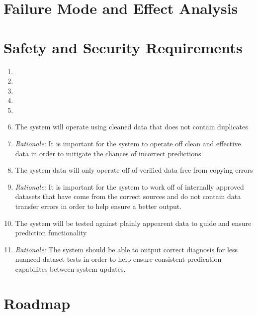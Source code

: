 \documentclass{article}
\begin{document}
\section{Failure Mode and Effect Analysis}


\section{Safety and Security Requirements}

\begin{enumerate}[label=SR\arabic*.]
	\item 
	\item
	\item 
	\item 
	\item 

	\item The system will operate using cleaned data that does not contain duplicates
	\item[] \emph{Rationale:} It is important for the system to operate off clean and effective data in order to mitigate the chances of incorrect predictions.
	
	\item The system data will only operate off of verified data free from copying errors
	\item[] \emph{Rationale:} It is important for the system to work off of internally approved datasets that have come from the correct sources and do not contain data transfer errors in order to help ensure a better output.

	\item The system will be tested against plainly appearent data to guide and ensure prediction functionality
	\item[] \emph{Rationale:} The system should be able to output correct diagnosis for less nuanced dataset tests in order to help ensure consistent predication capabilites between system updates.


\end{enumerate}



\section{Roadmap}
\end{document}
